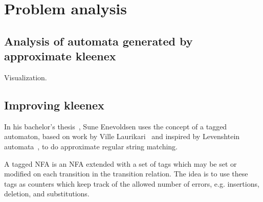 \section{Problem analysis}

\subsection{Analysis of automata generated by approximate kleenex}

Visualization.

\subsection{Improving kleenex}


In his bachelor's thesis~\cite{enevoldsen2015pattern}, Sune Enevoldsen uses the
concept of a tagged automaton, based on work by Ville
Laurikari~\cite{laurikari2000nfas, laurikari2001efficient} and inspired by
Levenshtein automata~\cite{schulz2002fast}, to do approximate regular string
matching.

A tagged NFA is an NFA extended with a set of tags which may be set or modified
on each transition in the transition relation. The idea is to use these tags as
counters which keep track of the allowed number of errors, e.g.  insertions,
deletion, and substitutions.








